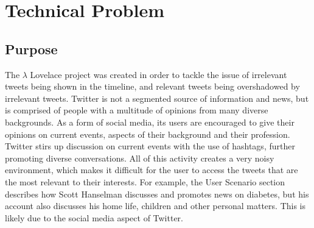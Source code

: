 \documentclass{article}
\begin{document}
\newpage


%
%
%


\section{Technical Problem} %

\subsection{Purpose} %
The $\lambda$ Lovelace project was created in order to tackle the issue of irrelevant tweets being shown in the timeline, and relevant tweets being overshadowed by irrelevant tweets. Twitter is not a segmented source of information and news, but is comprised of people with a multitude of opinions from many diverse backgrounds. As a form of social media, its users are encouraged to give their opinions on current events, aspects of their background and their profession. Twitter stirs up discussion on current events with the use of hashtags, further promoting diverse conversations. All of this activity creates a very noisy environment, which makes it difficult for the user to access the tweets that are the most relevant to their interests. For example, the User Scenario section describes how Scott Hanselman discusses and promotes news on diabetes, but his account also discusses his home life, children and other personal matters. This is likely due to the social media aspect of Twitter. 
\end{document}
